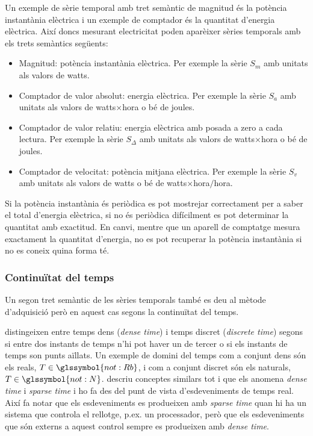 \begin{example}
  \label{ex:sgst:comptador-electricitat}
  Un exemple de sèrie temporal amb tret semàntic de magnitud és la
  potència instantània elèctrica i un exemple de comptador és la
  quantitat d'energia elèctrica. Així doncs mesurant electricitat
  poden aparèixer sèries temporals amb els trets semàntics següents:

  \begin{itemize}
  \item Magnitud: potència instantània elèctrica.  Per exemple la
    sèrie $S_m$ amb unitats als valors de watts.
  \item Comptador de valor absolut: energia elèctrica. Per exemple la
    sèrie $S_a$ amb unitats als valors de watts$\times$hora o bé de
    joules.
  \item Comptador de valor relatiu: energia elèctrica amb posada a
    zero a cada lectura. Per exemple la sèrie $S_\Delta$ amb unitats
    als valors de watts$\times$hora o bé de joules.
  \item Comptador de velocitat: potència mitjana elèctrica. Per
    exemple la sèrie $S_v$ amb unitats als valors de watts o bé de
    watts$\times$hora$/$hora.
  \end{itemize}

  Si la potència instantània és periòdica es pot mostrejar
  correctament per a saber el total d'energia elèctrica, si no és
  periòdica difícilment es pot determinar la quantitat amb exactitud.
  En canvi, mentre que un aparell de comptatge mesura exactament la
  quantitat d'energia, no es pot recuperar la potència instantània si
  no es coneix quina forma té. 
\end{example}



\subsubsection{Continuïtat del temps}


Un segon tret semàntic de les sèries temporals també es deu al mètode
d'adquisició però en aquest cas segons la continuïtat del temps.

\textcite{furia10:modeling_time} distingeixen entre temps dens
(\emph{dense time}) i temps discret (\emph{discrete time}) segons si
entre dos instants de temps n'hi pot haver un de tercer o si els
instants de temps son punts aïllats. Un exemple de domini del temps
com a conjunt dens són els reals, $T\in \glssymbol{not:Rb}$, i com a
conjunt discret són els naturals, $T\in \glssymbol{not:N}$.
\textcite[cap.~3]{kopetz11:realtime} descriu conceptes similars tot i
que els anomena \emph{dense time} i \emph{sparse time} i ho fa des del
punt de vista d'esdeveniments de temps real. Així fa notar que els
esdeveniments es produeixen amb \emph{sparse time} quan hi ha un
sistema que controla el rellotge, p.ex. un processador, però que els
esdeveniments que són externs a aquest control sempre es produeixen
amb \emph{dense time}.



